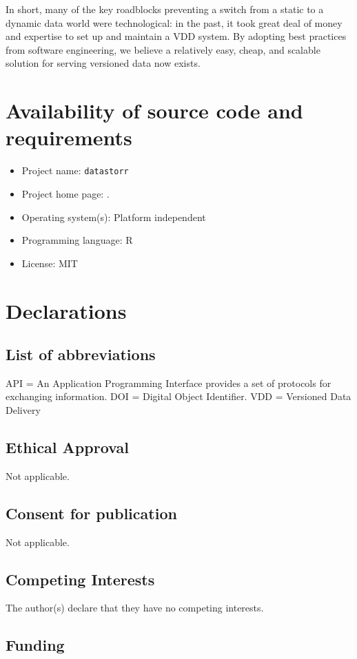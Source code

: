 \documentclass[a4paper,num-refs]{assets/oup-contemporary}
\begin{document}
In short, many of the key roadblocks preventing a switch from a static to a dynamic data world were technological: in the past, it took great deal of money and expertise to set up and maintain a VDD system. By adopting best practices from software engineering, we believe a relatively easy, cheap, and scalable solution for serving versioned data now exists.

\section{Availability of source code and requirements}

\begin{itemize}
\item Project name:  \texttt{datastorr} 
\item Project home page: .
\item Operating system(s): Platform independent
\item Programming language: R
\item License: MIT
\end{itemize}

\section{Declarations}

\subsection{List of abbreviations}
API = An Application Programming Interface provides a set of protocols for exchanging information. DOI = Digital Object Identifier. VDD = Versioned Data Delivery

\subsection{Ethical Approval}
Not applicable.

\subsection{Consent for publication}
Not applicable.
\subsection{Competing Interests}
The author(s) declare that they have no competing interests. 

\subsection{Funding}
\end{document}
